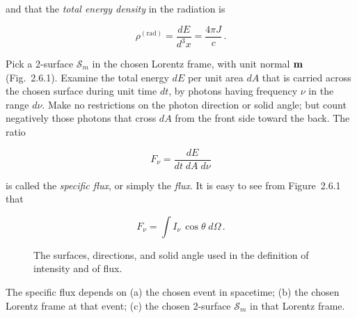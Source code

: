 and that the \textit{total energy density} in the radiation is

\begin{equation}
\rho^{(\text{rad})} = \frac{dE}{d^3x} = \frac{4\pi J}{c}\,.
\tag{2.6.6}
\end{equation}


Pick a 2-surface $\mathscr{S}_m$ in the chosen Lorentz frame, with unit normal $\mathbf{m}$ (Fig.\
2.6.1).  Examine the total energy $dE$ per unit area $dA$ that is carried across the
chosen surface during unit time $dt$, by photons having frequency $\nu$ in the range
$d\nu$.  Make no restrictions on the photon direction or solid angle; but count
negatively those photons that cross $dA$ from the front side toward the back.
The ratio

\begin{equation}
F_\nu = \frac{dE}{dt\;dA\;d\nu}
\tag{2.6.7}
\end{equation}

is called the \textit{specific flux}, or simply the \textit{flux}.  It is easy to see from Figure~2.6.1
that

\begin{equation}
F_\nu = \int I_\nu\,\cos\theta\;d\Omega\,.
\tag{2.6.8}
\end{equation}

\begin{figure}[htbp]
\centering
{}
\caption{The surfaces, directions, and solid angle used in the definition of intensity
and of flux.}
\label{fig:2.6.1}
\end{figure}

The specific flux depends on (a) the chosen event in spacetime; (b) the chosen
Lorentz frame at that event; (c) the chosen 2-surface $\mathscr{S}_m$ in that Lorentz frame.


